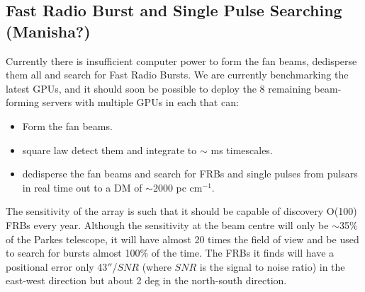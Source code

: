 \subsection{Fast Radio Burst and Single Pulse Searching (Manisha?)}

Currently there is insufficient computer power to form the fan beams, dedisperse them all and search for Fast Radio Bursts. We are currently benchmarking the latest GPUs, and it should soon be possible to deploy the 8 remaining beam-forming servers with multiple GPUs in each that can:
\begin{itemize}
\item Form the fan beams.
\item square law detect them and integrate to $\sim$ ms timescales.
\item dedisperse the fan beams and search for FRBs and single pulses from pulsars in real time out to a DM of $\sim$2000 pc cm$^{-1}$.
\end{itemize}

The sensitivity of the array is such that it should be capable of discovery O(100) FRBs every year. Although the sensitivity at the beam centre will only be $\sim$35\% of the Parkes telescope, it will have almost 20 times the field of view and be used to search for bursts almost 100\% of the time. The FRBs it finds will have a positional error only 43$''$/$SNR$ (where $SNR$ is the signal to noise ratio) in the east-west direction but about 2 deg in the north-south direction.